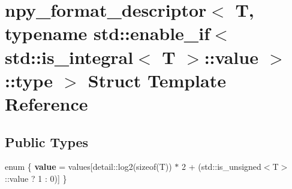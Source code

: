 \hypertarget{structnpy__format__descriptor_3_01_t_00_01typename_01std_1_1enable__if_3_01std_1_1is__integral_3989798e9d3de16e7af4f716a812ad122}{}\section{npy\+\_\+format\+\_\+descriptor$<$ T, typename std\+:\+:enable\+\_\+if$<$ std\+:\+:is\+\_\+integral$<$ T $>$\+:\+:value $>$\+:\+:type $>$ Struct Template Reference}
\label{structnpy__format__descriptor_3_01_t_00_01typename_01std_1_1enable__if_3_01std_1_1is__integral_3989798e9d3de16e7af4f716a812ad122}
\subsection*{Public Types}
\begin{DoxyCompactItemize}
\item 
enum \{ {\bfseries value} = values\mbox{[}detail\+:\+:log2(sizeof(T)) $\ast$ 2 + (std\+:\+:is\+\_\+unsigned$<$T$>$\+:\+:value ? 1 \+: 0)\mbox{]}
 \}\hypertarget{structnpy__format__descriptor_3_01_t_00_01typename_01std_1_1enable__if_3_01std_1_1is__integral_3989798e9d3de16e7af4f716a812ad122_a80e518eade2a8ebd2ad18a2fdcf48a41}{}\label{structnpy__format__descriptor_3_01_t_00_01typename_01std_1_1enable__if_3_01std_1_1is__integral_3989798e9d3de16e7af4f716a812ad122_a80e518eade2a8ebd2ad18a2fdcf48a41}

\end{DoxyCompactItemize}
